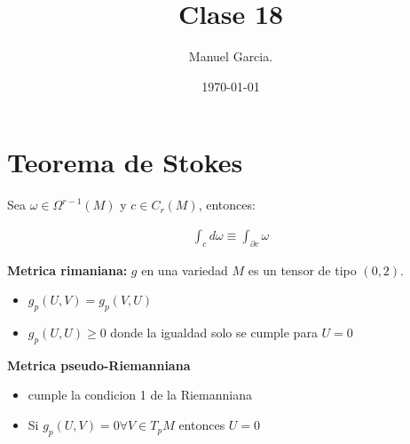 \documentclass{article}
\title{Clase 18 }
\author{Manuel Garcia.}
\date{\today}
\newcommand{\caja}[3]{%
  \begin{tcolorbox}[colback=#1!5!white,colframe=#1!25!black,title=#2]
    #3
  \end{tcolorbox}%
}
\begin{document}
\maketitle

\section{Teorema de Stokes }
Sea $ \omega \in \Omega ^ {r-1}(M) $ y $ c \in C_r(M)  $, entonces: 
\caja{red}{}{
  \begin{gather*}
    \displaystyle\int_{c }^{} d \omega \equiv \displaystyle\int_{\partial c }^{} \omega 
  \end{gather*}
}

\textbf{Metrica rimaniana: }
$ g  $ en una variedad $ M  $ es un tensor de tipo $ (0,2 ) $.
\begin{itemize}
  \item $g_p(U,V) = g_p(V,U)$
  \item $ g_p(U,U) \geq 0  $ donde la igualdad solo se cumple para $ U = 0  $
\end{itemize}
\textbf{Metrica pseudo-Riemanniana}
\begin{itemize}
  \item cumple la condicion 1 de la Riemanniana 
  \item Si $ g_p(U,V) = 0 \forall V \in T_p M  $ entonces $ U= 0  $
\end{itemize}
\end{document}
